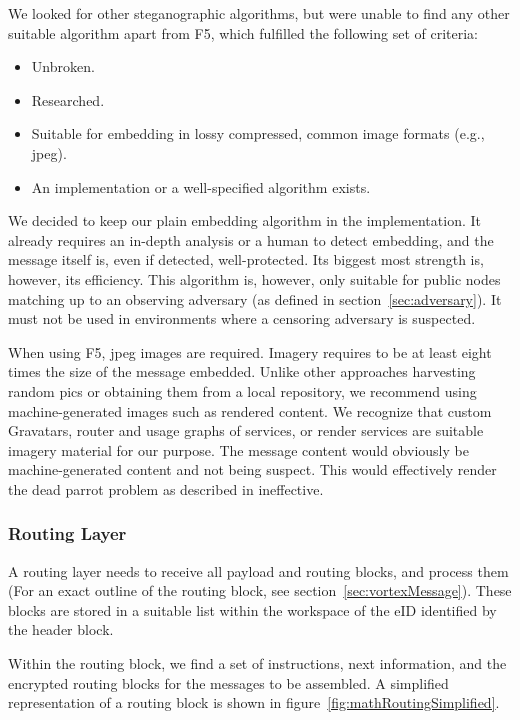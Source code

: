 We looked for other steganographic algorithms, but were unable to find any other suitable algorithm apart from F5, which fulfilled the following set of criteria:
\begin{itemize}
	\item Unbroken.
	\item Researched.
	\item Suitable for embedding in lossy compressed, common image formats (e.g., jpeg).
	\item An implementation or a well-specified algorithm exists.
\end{itemize}

We decided to keep our plain embedding algorithm in the implementation. It already requires an in-depth analysis or a human to detect embedding, and the message itself is, even if detected, well-protected. Its biggest most strength is, however, its efficiency. This algorithm is, however, only suitable for public nodes matching up to an observing adversary (as defined in section~\ref{sec:adversary}). It must not be used in environments where a censoring adversary is suspected.

When using F5, jpeg images are required. Imagery requires to be at least eight times the size of the message embedded. Unlike other approaches harvesting random pics or obtaining them from a local repository, we recommend using machine-generated images such as rendered content. We recognize that custom Gravatars, router and usage graphs of services, or render services are suitable imagery material for our purpose. The message content would obviously be machine-generated content and not being suspect. This would effectively render the dead parrot problem as described in \cite{oakland2013-parrot} ineffective. 

\subsubsection{Routing Layer\label{sec:routingLayer}}
A routing layer needs to receive all payload and routing blocks, and process them (For an exact outline of the routing block, see section~\ref{sec:vortexMessage}). These blocks are stored in a suitable list within the workspace of the eID identified by the header block.

Within the routing block, we find a set of instructions, next \VortexNodes information, and the encrypted routing blocks for the messages to be assembled. A simplified representation of a routing block is shown in figure~\ref{fig:mathRoutingSimplified}.

